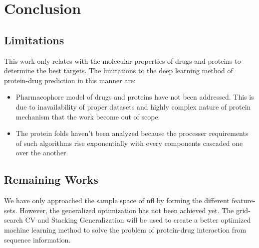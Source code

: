 \chapter{Conclusion}

\section{Limitations}
This work only relates with the molecular properties of drugs and proteins to determine the best targets. The limitations to the deep learning method of protein-drug prediction in this manner are:
\begin{itemize}
    \item Pharmacophore model of drugs and proteins have not been addressed. This is due to inavailability of proper datasets and highly complex nature of protein mechanism that the work become out of scope.
    \item The protein folds haven't been analyzed because the processer requirements of such algorithms rise exponentially with every components cascaded one over the another.
\end{itemize}

\section{Remaining Works}
We have only approached the sample space of \acrfull{nfl} by forming the different feature-sets. However, the generalized optimization has not been achieved yet. The grid-search CV and Stacking Generalization will be used to create a better optimized machine learning method to solve the problem of protein-drug interaction from sequence information.

\iffalse
\section{Future Work}
The future works can be listed as below:
\begin{itemize}
    \item The molecular dockings of drugs with proteins should be analysed using the contact maps of proteins to properly.
    \item The pharmacological model to identify safe drugs for treating diseases need to assessed.
    \item Molecular dynamics should be related to drugs factor when determining the druggability of proteins.
\end{itemize}
\fi

